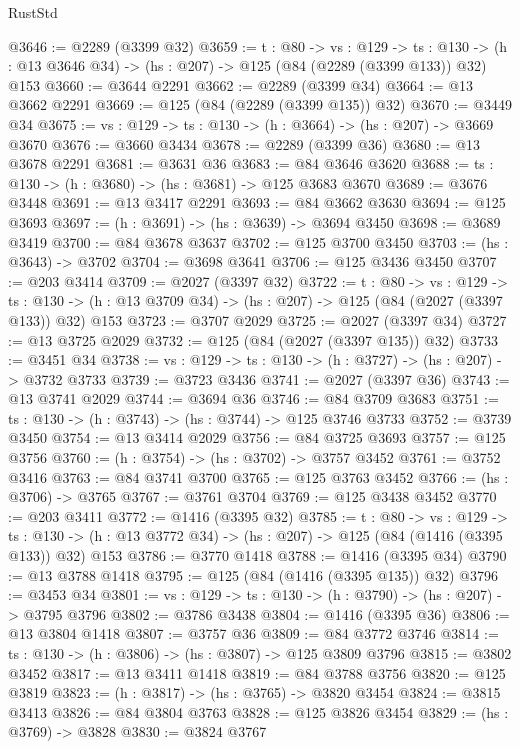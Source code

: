\begin{lexlean}{RustStd}
\begin{coremodule}
@3646 := @2289 (@3399 @32)
@3659 := {t : @80} ->
  {vs : @129} ->
  {ts : @130} -> (h : @13 @3646 @34) -> (hs : @207) -> @125 (@84 (@2289 (@3399 @133)) @32) @153
@3660 := @3644 @2291
@3662 := @2289 (@3399 @34)
@3664 := @13 @3662 @2291
@3669 := @125 (@84 (@2289 (@3399 @135)) @32)
@3670 := @3449 @34
@3675 := {vs : @129} -> {ts : @130} -> (h : @3664) -> (hs : @207) -> @3669 @3670
@3676 := @3660 @3434
@3678 := @2289 (@3399 @36)
@3680 := @13 @3678 @2291
@3681 := @3631 @36
@3683 := @84 @3646 @3620
@3688 := {ts : @130} -> (h : @3680) -> (hs : @3681) -> @125 @3683 @3670
@3689 := @3676 @3448
@3691 := @13 @3417 @2291
@3693 := @84 @3662 @3630
@3694 := @125 @3693
@3697 := (h : @3691) -> (hs : @3639) -> @3694 @3450
@3698 := @3689 @3419
@3700 := @84 @3678 @3637
@3702 := @125 @3700 @3450
@3703 := (hs : @3643) -> @3702
@3704 := @3698 @3641
@3706 := @125 @3436 @3450
@3707 := @203 @3414
@3709 := @2027 (@3397 @32)
@3722 := {t : @80} ->
  {vs : @129} ->
  {ts : @130} -> (h : @13 @3709 @34) -> (hs : @207) -> @125 (@84 (@2027 (@3397 @133)) @32) @153
@3723 := @3707 @2029
@3725 := @2027 (@3397 @34)
@3727 := @13 @3725 @2029
@3732 := @125 (@84 (@2027 (@3397 @135)) @32)
@3733 := @3451 @34
@3738 := {vs : @129} -> {ts : @130} -> (h : @3727) -> (hs : @207) -> @3732 @3733
@3739 := @3723 @3436
@3741 := @2027 (@3397 @36)
@3743 := @13 @3741 @2029
@3744 := @3694 @36
@3746 := @84 @3709 @3683
@3751 := {ts : @130} -> (h : @3743) -> (hs : @3744) -> @125 @3746 @3733
@3752 := @3739 @3450
@3754 := @13 @3414 @2029
@3756 := @84 @3725 @3693
@3757 := @125 @3756
@3760 := (h : @3754) -> (hs : @3702) -> @3757 @3452
@3761 := @3752 @3416
@3763 := @84 @3741 @3700
@3765 := @125 @3763 @3452
@3766 := (hs : @3706) -> @3765
@3767 := @3761 @3704
@3769 := @125 @3438 @3452
@3770 := @203 @3411
@3772 := @1416 (@3395 @32)
@3785 := {t : @80} ->
  {vs : @129} ->
  {ts : @130} -> (h : @13 @3772 @34) -> (hs : @207) -> @125 (@84 (@1416 (@3395 @133)) @32) @153
@3786 := @3770 @1418
@3788 := @1416 (@3395 @34)
@3790 := @13 @3788 @1418
@3795 := @125 (@84 (@1416 (@3395 @135)) @32)
@3796 := @3453 @34
@3801 := {vs : @129} -> {ts : @130} -> (h : @3790) -> (hs : @207) -> @3795 @3796
@3802 := @3786 @3438
@3804 := @1416 (@3395 @36)
@3806 := @13 @3804 @1418
@3807 := @3757 @36
@3809 := @84 @3772 @3746
@3814 := {ts : @130} -> (h : @3806) -> (hs : @3807) -> @125 @3809 @3796
@3815 := @3802 @3452
@3817 := @13 @3411 @1418
@3819 := @84 @3788 @3756
@3820 := @125 @3819
@3823 := (h : @3817) -> (hs : @3765) -> @3820 @3454
@3824 := @3815 @3413
@3826 := @84 @3804 @3763
@3828 := @125 @3826 @3454
@3829 := (hs : @3769) -> @3828
@3830 := @3824 @3767

\end{coremodule}
\end{lexlean}
